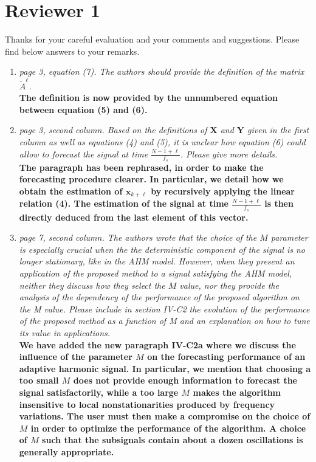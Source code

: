 \documentclass[11pt,DIV=16]{scrartcl}
\begin{document}
\section*{Reviewer 1}
Thanks for your careful evaluation and your comments and suggestions. Please find below answers to your remarks.
\begin{enumerate}[1)]
\item
\textit{page 3, equation (7). The authors should provide the definition of the matrix $\tilde{A}^\ell$.}\\
\textbf{The definition is now provided by the unnumbered equation between equation (5) and (6).}
\item
\textit{page 3, second column. Based on the definitions of $\mathbf{X}$ and $\mathbf{Y}$ given in the first column as well as equations (4) and (5), it is unclear how equation (6) could allow to forecast the signal at time $\frac{N-1+\ell}{f_s}$. Please give more details.}\\
\textbf{The paragraph has been rephrased, in order to make the forecasting procedure clearer. In particular, we detail how we obtain the estimation of $\mathbf{x}_{k+\ell}$ by recursively applying the linear relation (4). The estimation of the signal at time $\frac{N-1+\ell}{f_s}$ is then directly deduced from the last element of this vector.}
\item
\textit{page 7, second column. The authors wrote that the choice of the $M$ parameter is especially crucial when the the deterministic component of the signal is no longer stationary, like in the AHM model.
However, when they present an application of the proposed method to a signal satisfying the AHM model, neither they discuss how they select the $M$ value, nor they provide the analysis of the dependency of the performance of the proposed algorithm on the M value. Please include in section IV-C2 the evolution of the performance of the proposed method as a function of M and an explanation on how to tune its value in applications.}\\
\textbf{We have added the new paragraph IV-C2a where we discuss the influence of the parameter $M$ on the forecasting performance of an adaptive harmonic signal. In particular, we mention that choosing a too small $M$ does not provide enough information to forecast the signal satisfactorily, while a too large $M$ makes the algorithm insensitive to local nonstationarities produced by frequency variations. The user must then make a compromise on the choice of $M$ in order to optimize the performance of the algorithm. A choice of $M$ such that the subsignals contain about a dozen oscillations is generally appropriate.}

\end{enumerate}
\end{document}
